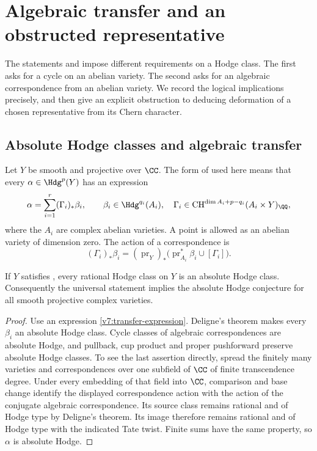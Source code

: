 \section{Algebraic transfer and an obstructed representative}\label{sec:v7-bypass}

The statements \Fii{} and \Fiii{} impose different requirements on a Hodge
class.  The first asks for a cycle on an abelian variety.  The second asks
for an algebraic correspondence from an abelian variety.  We record the
logical implications precisely, and then give an explicit obstruction to
deducing deformation of a chosen representative from its Chern character.

\subsection{Absolute Hodge classes and algebraic transfer}

Let $Y$ be smooth and projective over $\CC$.  The form of \Fiii{} used here
means that every $\alpha\in\Hdg^p(Y)$ has an expression
\begin{equation}\label{v7:transfer-expression}
 \alpha=\sum_{i=1}^{r}(\Gamma_i)_*\beta_i,
 \qquad
 \beta_i\in\Hdg^{q_i}(A_i),\quad
 \Gamma_i\in\operatorname{CH}^{\dim A_i+p-q_i}(A_i\times Y)_{\QQ},
\end{equation}
where the $A_i$ are complex abelian varieties.  A point is allowed as an
abelian variety of dimension zero.  The action of a correspondence is
\[
 (\Gamma_i)_*\beta_i
   =(\operatorname{pr}_Y)_*
       \bigl(\operatorname{pr}_{A_i}^*\beta_i\cup[\Gamma_i]\bigr).
\]

\begin{proposition}\label{v7:absolute-transfer}
If $Y$ satisfies \Fiii{}, every rational Hodge class on $Y$ is an absolute
Hodge class.  Consequently the universal statement \Fiii{} implies the
absolute Hodge conjecture for all smooth projective complex varieties.
\end{proposition}

\begin{proof}
Use an expression \eqref{v7:transfer-expression}.  Deligne's theorem
\cite[Theorem~2.11]{Del82} makes every $\beta_i$ an absolute Hodge class.
Cycle classes of algebraic correspondences are absolute Hodge, and
pullback, cup product and proper pushforward preserve absolute Hodge
classes.  To see the last assertion directly, spread the finitely many
varieties and correspondences over one subfield of $\CC$ of finite
transcendence degree.  Under every embedding of that field into $\CC$,
comparison and base change identify the displayed correspondence action
with the action of the conjugate algebraic correspondence.  Its source
class remains rational and of Hodge type by Deligne's theorem.  Its image
therefore remains rational and of Hodge type with the indicated Tate
twist.  Finite sums have the same property, so $\alpha$ is absolute Hodge.
\end{proof}

